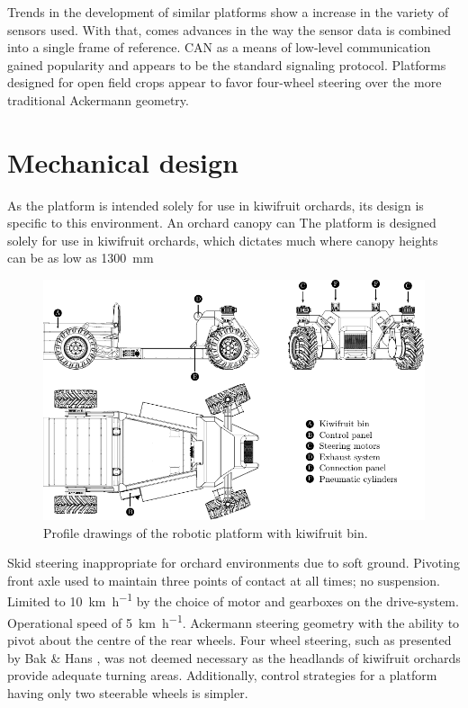 \documentclass[preprint,authoryear,12pt]{elsarticle}
\begin{document}
    Trends in the development of similar platforms show a increase in the variety of sensors used.
    With that, comes advances in the way the sensor data is combined into a single frame of reference.
    CAN as a means of low-level communication gained popularity and appears to be the standard signaling protocol.
    Platforms designed for open field crops appear to favor four-wheel steering over the more traditional Ackermann geometry.

\section{Mechanical design}
\label{sect:mechanical}

    As the platform is intended solely for use in kiwifruit orchards, its design is specific to this environment.
    An orchard canopy can 
    The platform is designed solely for use in kiwifruit orchards, which dictates much 
    where canopy heights can be as low as \SI{1300}{\milli\meter}

    \begin{figure}[htbp]
        \centering
        \includegraphics[width=\linewidth]{imgs/profile_views/AMMP-All-Labelled.pdf}
        \caption{Profile drawings of the robotic platform with kiwifruit bin.}
        \label{fig:AMMP}
    \end{figure}

    Skid steering inappropriate for orchard environments due to soft ground.
    Pivoting front axle used to maintain three points of contact at all times; no suspension.
    Limited to \SI{10}{\kilo\meter\per\hour} by the choice of motor and gearboxes on the drive-system.
    Operational speed of \SI{5}{\kilo\meter\per\hour}.
    Ackermann steering geometry with the ability to pivot about the centre of the rear wheels.
    Four wheel steering, such as presented by Bak \& Hans \citep{Bak2004}, was not deemed necessary as the headlands of kiwifruit orchards provide adequate turning areas.
    Additionally, control strategies for a platform having only two steerable wheels is simpler.
\end{document}

